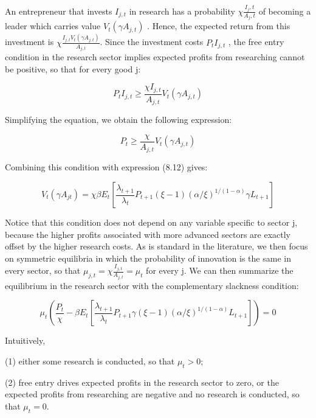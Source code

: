 \documentclass[10pt,math=newtx,citestyle=gb7714-2015,bibstyle=gb7714-2015]{elegantbook}
\begin{document}
{{{An entrepreneur that invests $I_{j,t}$ in research has a probability $\chi\frac{I_j,t}{A_j,t}$ of becoming a leader which carries value $V_t (\gamma A_{j,t} )$ . Hence, the expected return from this investment is $\chi \frac{I_{j,t}V_t (\gamma A_{j,t} )}{A_{j,t}} $. Since the investment costs $P_t I_{j,t}$ , the free entry condition in the research sector implies expected profits from researching cannot be positive, so that for every good j:

\begin{equation}
	P_{t} I_{j,t} \geq \frac{\chi I_{j,t}}{A_{j,t}} V_{t}\left(\gamma A_{j,t}\right)
\end{equation}

Simplifying the equation, we obtain the following expression: 

\begin{equation}
	P_{t}  \geq \frac{\chi}{A_{j,t}} V_{t}\left(\gamma A_{j,t}\right)
	\end{equation}

Combining this condition with expression (8.12) gives:

\begin{equation}
	V_{t}\left(\gamma A_{j t}\right)= \chi \beta E_{t}\left[\frac{\lambda_{t+1}}{\lambda_{t}} P_{t+1} (\xi-1)(\alpha / \xi)^{1 /(1-\alpha)} \gamma L_{t+1}\right]
\end{equation}

Notice that this condition does not depend on any variable specific to sector j, because the higher profits associated with more advanced sectors are exactly offset by the higher research costs. As is standard in the literature, we then focus on symmetric equilibria in which the probability of innovation is the same in every sector, so that $\mu_{j,t} =\chi \frac{ I_{j,t}}{A_{j,t}} = \mu_t$ for every j. We can then summarize the equilibrium in the research sector with the complementary slackness condition:

\begin{equation}
	\mu_{t}\left(\frac{P_{t}}{\chi}-\beta E_{t}\left[\frac{\lambda_{t+1}}{\lambda_{t}} P_{t+1} \gamma (\xi-1)(\alpha / \xi)^{1 /(1-\alpha)} L_{t+1}\right]\right)=0
\end{equation}

Intuitively, 

(1) either some research is conducted, so that $\mu_t >0$;

(2) free entry drives expected profits in the research sector to zero, or the expected profits from researching are negative and no research is conducted, so that $\mu_t =0$.

}}}
\end{document}

